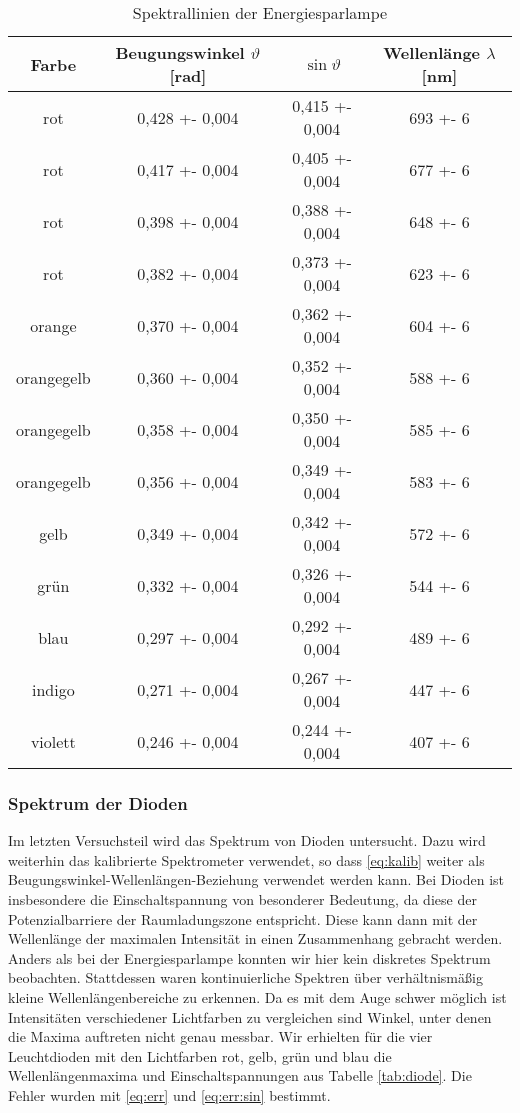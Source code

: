 \begin{table}[H]
	\centering
	\begin{tabular}{cSSS[table-format=3+-1]}
	Farbe & {Beugungswinkel $ \vartheta $ [\si{\radian}]} & {$ \sin\vartheta $} & {Wellenlänge $ \lambda $ [\si{\nano\meter}]}\\\hline\hline
	rot & 0,428 +- 0,004 & 0,415 +- 0,004 & 693 +- 6 \\
	rot & 0,417 +- 0,004 & 0,405 +- 0,004 & 677 +- 6 \\
	rot & 0,398 +- 0,004 & 0,388 +- 0,004 & 648 +- 6 \\
	rot & 0,382 +- 0,004 & 0,373 +- 0,004 & 623 +- 6 \\
	orange & 0,370 +- 0,004 & 0,362 +- 0,004 & 604 +- 6 \\
	orangegelb & 0,360 +- 0,004 & 0,352 +- 0,004 & 588 +- 6 \\
	orangegelb & 0,358 +- 0,004 & 0,350 +- 0,004 & 585 +- 6 \\
	orangegelb & 0,356 +- 0,004 & 0,349 +- 0,004 & 583 +- 6 \\
	gelb & 0,349 +- 0,004 & 0,342 +- 0,004 & 572 +- 6 \\
	grün & 0,332 +- 0,004 & 0,326 +- 0,004 & 544 +- 6 \\
	blau & 0,297 +- 0,004 & 0,292 +- 0,004 & 489 +- 6 \\
	indigo & 0,271 +- 0,004 & 0,267 +- 0,004 & 447 +- 6 \\
	violett & 0,246 +- 0,004 & 0,244 +- 0,004 & 407 +- 6
	\end{tabular}
	\caption{Spektrallinien der Energiesparlampe}
	\label{tab:espar}
\end{table}

\subsubsection{Spektrum der Dioden}
Im letzten Versuchsteil wird das Spektrum von Dioden untersucht. Dazu wird weiterhin das kalibrierte Spektrometer verwendet, so dass \eqref{eq:kalib} weiter als Beugungswinkel-Wellenlängen-Beziehung verwendet werden kann. Bei Dioden ist insbesondere die Einschaltspannung von besonderer Bedeutung, da diese der Potenzialbarriere der Raumladungszone entspricht. Diese kann dann mit der Wellenlänge der maximalen Intensität in einen Zusammenhang gebracht werden.\\
Anders als bei der Energiesparlampe konnten wir hier kein diskretes Spektrum beobachten. Stattdessen waren kontinuierliche Spektren über verhältnismäßig kleine Wellenlängenbereiche zu erkennen. Da es mit dem Auge schwer möglich ist Intensitäten verschiedener Lichtfarben zu vergleichen sind Winkel, unter denen die Maxima auftreten nicht genau messbar. Wir erhielten für die vier Leuchtdioden mit den Lichtfarben rot, gelb, grün und blau die Wellenlängenmaxima und Einschaltspannungen aus Tabelle \ref{tab:diode}. Die Fehler wurden mit \eqref{eq:err} und \eqref{eq:err:sin} bestimmt.

